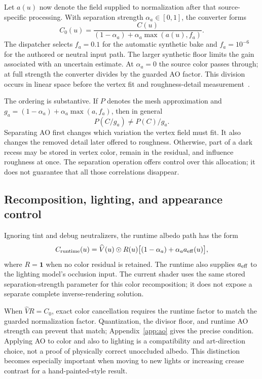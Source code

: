 \documentclass[11pt,letterpaper]{article}
\newcommand{\one}{\mathbf{1}}
\newcommand{\vcol}{\widehat{V}}
\begin{document}
Let $a(u)$ now denote the field supplied to normalization after that source-specific processing. With separation strength $\alpha_a\in[0,1]$, the converter forms
\begin{equation}
C_0(u)=\frac{C(u)}{(1-\alpha_a)+\alpha_a\max(a(u),f_a)}.
\label{eq:ao}
\end{equation}
The dispatcher selects $f_a=0.1$ for the automatic synthetic bake and $f_a=10^{-6}$ for the authored or neutral input path. The larger synthetic floor limits the gain associated with an uncertain estimate. At $\alpha_a=0$ the source color passes through; at full strength the converter divides by the guarded AO factor. This division occurs in linear space before the vertex fit and roughness-detail measurement~\cite{namer2026}.

The ordering is substantive. If $P$ denotes the mesh approximation and $g_a=(1-\alpha_a)+\alpha_a\max(a,f_a)$, then in general
\begin{equation}
P(C/g_a)\ne P(C)/g_a.
\label{eq:aoorder}
\end{equation}
Separating AO first changes which variation the vertex field must fit. It also changes the removed detail later offered to roughness. Otherwise, part of a dark recess may be stored in vertex color, remain in the residual, and influence roughness at once. The separation operation offers control over this allocation; it does not guarantee that all those correlations disappear.

\subsection{Recomposition, lighting, and appearance control}
Ignoring tint and debug neutralizers, the runtime albedo path has the form
\begin{equation}
C_{\rm runtime}(u)=\vcol(u)\odot R(u)
 \bigl[(1-\alpha_a)+\alpha_a a_{\rm eff}(u)\bigr],
\label{eq:aoruntime}
\end{equation}
where $R=\one$ when no color residual is retained. The runtime also supplies $a_{\rm eff}$ to the lighting model's occlusion input. The current shader uses the same stored separation-strength parameter for this color recomposition; it does not expose a separate complete inverse-rendering solution.

When $\vcol R=C_0$, exact color cancellation requires the runtime factor to match the guarded normalization factor. Quantization, the divisor floor, and runtime AO strength can prevent that match; Appendix~\ref{app:ao} gives the precise condition. Applying AO to color and also to lighting is a compatibility and art-direction choice, not a proof of physically correct unoccluded albedo. This distinction becomes especially important when moving to new lights or increasing crease contrast for a hand-painted-style result.
\end{document}
